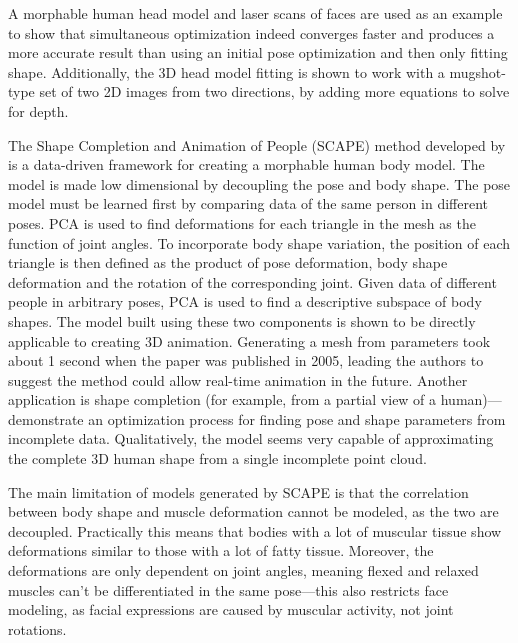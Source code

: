 A morphable human head model and laser scans of faces are used as an example to show that simultaneous optimization indeed converges faster and produces a more accurate result than using an initial pose optimization and then only fitting shape. Additionally, the 3D head model fitting is shown to work with a mugshot-type set of two 2D images from two directions, by adding more equations to solve for depth. \citep{schneider2010fitting}


The Shape Completion and Animation of People (SCAPE) method developed by \citet{anguelov2005scape} is a data-driven framework for creating a morphable human body model. The model is made low dimensional by decoupling the pose and body shape. The pose model must be learned first by comparing data of the same person in different poses. PCA is used to find deformations for each triangle in the mesh as the function of joint angles. To incorporate body shape variation, the position of each triangle is then defined as the product of pose deformation, body shape deformation and the rotation of the corresponding joint. Given data of different people in arbitrary poses, PCA is used to find a descriptive subspace of body shapes. The model built using these two components is shown to be directly applicable to creating 3D animation. Generating a mesh from parameters took about 1 second when the paper was published in 2005, leading the authors to suggest the method could allow real-time animation in the future. Another application is shape completion (for example, from a partial view of a human)---\citeauthor{anguelov2005scape} demonstrate an optimization process for finding pose and shape parameters from incomplete data. Qualitatively, the model seems very capable of approximating the complete 3D human shape from a single incomplete point cloud.

The main limitation of models generated by SCAPE is that the correlation between body shape and muscle deformation cannot be modeled, as the two are decoupled. Practically this means that bodies with a lot of muscular tissue show deformations similar to those with a lot of fatty tissue. Moreover, the deformations are only dependent on joint angles, meaning flexed and relaxed muscles can't be differentiated in the same pose---this also restricts face modeling, as facial expressions are caused by muscular activity, not joint rotations. \citep{anguelov2005scape}

\newtopic


